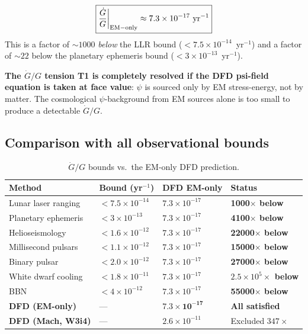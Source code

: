 \documentclass[11pt]{article}
\newcommand{\ee}[1]{\times 10^{#1}}
\newcommand{\Gdot}{\dot{G}/G}
\begin{document}
\begin{tcolorbox}[colback=green!5!white, colframe=green!60!black,
  title=\textbf{T1 RESOLVED: $\Gdot$ from EM-Only Sourcing Is 1000$\times$ Below LLR}]
\begin{equation}
\boxed{\frac{\dot{G}}{G}\bigg|_{\rm EM-only} \approx 7.3\ee{-17}~\text{yr}^{-1}}
\end{equation}
This is a factor of $\sim 1000$ \emph{below} the LLR bound
($< 7.5\ee{-14}$~yr$^{-1}$) and a factor of $\sim 22$ below the
planetary ephemeris bound ($< 3\ee{-13}$~yr$^{-1}$).

\textbf{The $\dot{G}/G$ tension T1 is completely resolved if the DFD
psi-field equation is taken at face value}: $\psi$ is sourced only by
EM stress-energy, not by matter. The cosmological $\psi$-background
from EM sources alone is too small to produce a detectable $\dot{G}/G$.
\end{tcolorbox}

\subsection{Comparison with all observational bounds}

\begin{table}[h]
\centering
\caption{$\Gdot$ bounds vs.\ the EM-only DFD prediction.}
\label{tab:Gdot-EM}
\begin{tabular}{llll}
\toprule
\textbf{Method} & \textbf{Bound (yr$^{-1}$)} & \textbf{DFD EM-only} & \textbf{Status} \\
\midrule
Lunar laser ranging & $< 7.5\ee{-14}$ & $7.3\ee{-17}$ & \textbf{1000$\times$ below} \\
Planetary ephemeris & $< 3\ee{-13}$ & $7.3\ee{-17}$ & \textbf{4100$\times$ below} \\
Helioseismology & $< 1.6\ee{-12}$ & $7.3\ee{-17}$ & \textbf{22000$\times$ below} \\
Millisecond pulsars & $< 1.1\ee{-12}$ & $7.3\ee{-17}$ & \textbf{15000$\times$ below} \\
Binary pulsar & $< 2.0\ee{-12}$ & $7.3\ee{-17}$ & \textbf{27000$\times$ below} \\
White dwarf cooling & $< 1.8\ee{-11}$ & $7.3\ee{-17}$ & \textbf{$2.5\ee{5}\times$ below} \\
BBN & $< 4\ee{-12}$ & $7.3\ee{-17}$ & \textbf{55000$\times$ below} \\
\midrule
\textbf{DFD (EM-only)} & --- & $\mathbf{7.3\ee{-17}}$ & \textbf{All satisfied} \\
\textbf{DFD (Mach, W3i4)} & --- & $2.6\ee{-11}$ & Excluded $347\times$ \\
\bottomrule
\end{tabular}
\end{table}
\end{document}
